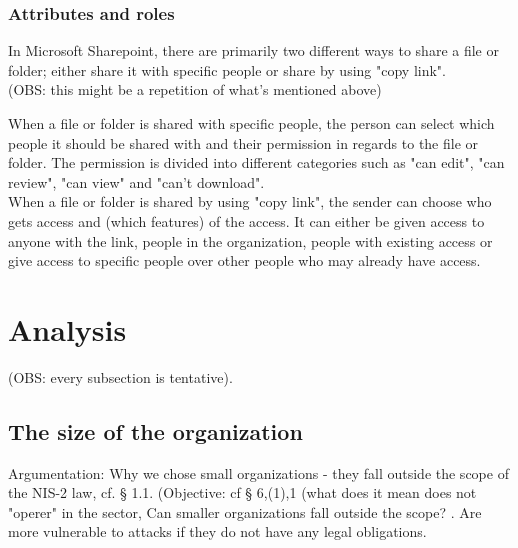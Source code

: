 \documentclass[12pt,a4paper]{article}
\begin{document}
\subsubsection{Attributes and roles}
In Microsoft Sharepoint, there are primarily two different ways to share a file or folder; either share it with specific people or share by using "copy link".\cite{sharepoint}\\ (OBS: this might be a repetition of what's mentioned above)

When a file or folder is shared with specific people, the person can select which people it should be shared with and their permission in regards to the file or folder.\cite{sharepoint} The permission is divided into different categories such as "can edit", "can review", "can view" and "can't download".\cite{sharepoint}\\

When a file or folder is shared by using "copy link", the sender can choose who gets access and (which features) of the access. It can either be given access to anyone with the link, people in the organization, people with existing access or give access to specific people over other people who may already have access.\cite{sharepoint}  


\section{Analysis}
(OBS: every subsection is tentative). 
\subsection{The size of the organization}
Argumentation: Why we chose small organizations - they fall outside the scope of the NIS-2 law, cf. § 1.1. (Objective: cf § 6,(1),1 (what does it mean does not "operer" in the sector, Can smaller organizations fall outside the scope? . Are more vulnerable to attacks if they do not have any legal obligations.
\end{document}
